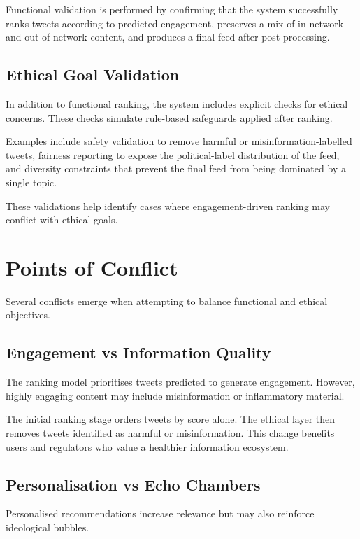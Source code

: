 \documentclass[]
{UCD_CS_41820_Report}
\begin{document}
Functional validation is performed by confirming that the system successfully ranks tweets according to predicted engagement, preserves a mix of in-network and out-of-network content, and produces a final feed after post-processing.

\subsection{Ethical Goal Validation}

In addition to functional ranking, the system includes explicit checks for ethical concerns. These checks simulate rule-based safeguards applied after ranking.

Examples include safety validation to remove harmful or misinformation-labelled tweets, fairness reporting to expose the political-label distribution of the feed, and diversity constraints that prevent the final feed from being dominated by a single topic.

These validations help identify cases where engagement-driven ranking may conflict with ethical goals.

\section{Points of Conflict}

Several conflicts emerge when attempting to balance functional and ethical objectives.

\subsection{Engagement vs Information Quality}

The ranking model prioritises tweets predicted to generate engagement. However, highly engaging content may include misinformation or inflammatory material.

The initial ranking stage orders tweets by score alone. The ethical layer then removes tweets identified as harmful or misinformation. This change benefits users and regulators who value a healthier information ecosystem.

\subsection{Personalisation vs Echo Chambers}

Personalised recommendations increase relevance but may also reinforce ideological bubbles.
\end{document}
